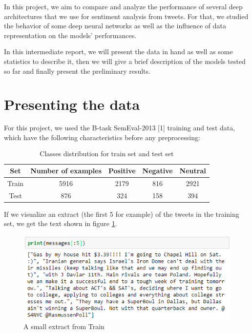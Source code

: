 \documentclass[a4paper,english,12pt]{article}
\begin{document}
In this project, we aim to compare and analyze the performance of several deep architectures that we use for sentiment analysis from tweets. For that, we studied the behavior of some deep neural networks as well as the influence of data representation on the models' performances. 

In this intermediate report, we will present the data in hand as well as some statistics to describe it, then we will give a brief description of the models tested so far and finally present the preliminary results. 

\section{Presenting the data}
For this project, we used the B-task SemEval-2013 [1] training and test data, which have the following characteristics before any preprocessing:

\begin{table}[H]\centering
\begin{tabular}{|c|c|c|c|c|}

\hline
Set & Number of examples & Positive & Negative & Neutral\\
\hline
Train & 5916 & 2179 & 816 & 2921\\
\hline
Test & 876 & 324 & 158 & 394\\
\hline

\end{tabular}
\caption{Classes distribution for train set and test set}
\end{table}

If we visualize an extract (the first 5 for example) of the tweets in the training set, we get the text shown in figure \ref{extract}.

\begin{figure}[h!]
\centering
\includegraphics[scale=1]{extract}
\caption{A small extract from Train}
\label{extract}
\end{figure}
\end{document}
